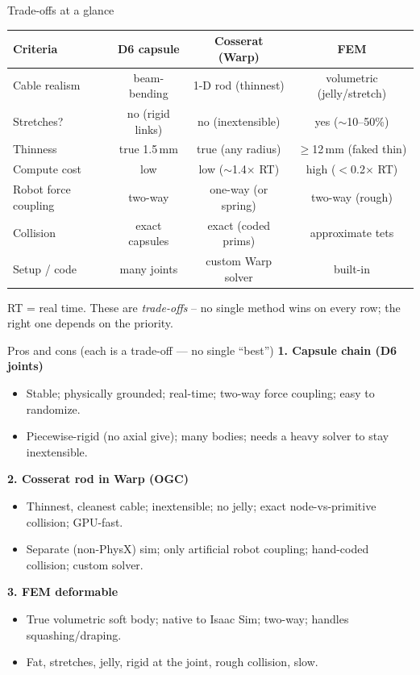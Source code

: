\documentclass[aspectratio=169]{beamer}
\begin{document}
\begin{frame}{Trade-offs at a glance}
  \centering\renewcommand{\arraystretch}{1.25}
  \begin{tabular}{lccc}
    \toprule
    \textbf{Criteria} & \textbf{D6 capsule} & \textbf{Cosserat (Warp)} & \textbf{FEM} \\
    \midrule
    Cable realism       & beam-bending       & 1-D rod (thinnest)      & volumetric (jelly/stretch) \\
    Stretches?          & no (rigid links)   & no (inextensible)       & yes ($\sim$10--50\%) \\
    Thinness            & true 1.5\,mm       & true (any radius)       & $\geq$12\,mm (faked thin) \\
    Compute cost        & low                & low ($\sim$1.4$\times$ RT) & high ($<$0.2$\times$ RT) \\
    Robot force coupling& two-way            & one-way (or spring)     & two-way (rough) \\
    Collision           & exact capsules     & exact (coded prims)     & approximate tets \\
    Setup / code        & many joints        & custom Warp solver      & built-in \\
    \bottomrule
  \end{tabular}
  \vfill
  {\footnotesize RT = real time. These are \emph{trade-offs} -- no single method wins
   on every row; the right one depends on the priority.}
\end{frame}

\begin{frame}{Pros and cons (each is a trade-off --- no single ``best'')}
  \footnotesize
  \textbf{1. Capsule chain (D6 joints)}
  \begin{itemize}\itemsep0pt
    \item[\textcolor{mygreen}{+}] Stable; physically grounded; real-time; two-way force coupling; easy to randomize.
    \item[\textcolor{myred}{--}] Piecewise-rigid (no axial give); many bodies; needs a heavy solver to stay inextensible.
  \end{itemize}
  \textbf{2. Cosserat rod in Warp (OGC)}
  \begin{itemize}\itemsep0pt
    \item[\textcolor{mygreen}{+}] Thinnest, cleanest cable; inextensible; no jelly; exact node-vs-primitive collision; GPU-fast.
    \item[\textcolor{myred}{--}] Separate (non-PhysX) sim; only artificial robot coupling; hand-coded collision; custom solver.
  \end{itemize}
  \textbf{3. FEM deformable}
  \begin{itemize}\itemsep0pt
    \item[\textcolor{mygreen}{+}] True volumetric soft body; native to Isaac Sim; two-way; handles squashing/draping.
    \item[\textcolor{myred}{--}] Fat, stretches, jelly, rigid at the joint, rough collision, slow.
  \end{itemize}
\end{frame}
\end{document}
